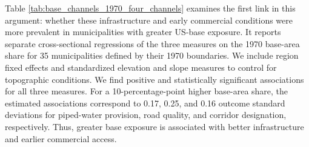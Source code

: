 \documentclass[12pt, unicode, a4paper]{article}
\newcommand{\1}{\mbox{1}\hspace{-0.25em}\mbox{l}} %
\begin{document}
Table \ref{tab:base_channels_1970_four_channels} examines the first link in this argument: whether these infrastructure and early commercial conditions were more prevalent in municipalities with greater US-base exposure. It reports separate cross-sectional regressions of the three measures on the 1970 base-area share for 35 municipalities defined by their 1970 boundaries. We include region fixed effects and standardized elevation and slope measures to control for topographic conditions.
We find positive and statistically significant associations for all three measures. For a 10-percentage-point higher base-area share, the estimated associations correspond to 0.17, 0.25, and 0.16 outcome standard deviations for piped-water provision, road quality, and corridor designation, respectively. Thus, greater base exposure is associated with better infrastructure and earlier commercial access. 
\end{document}
